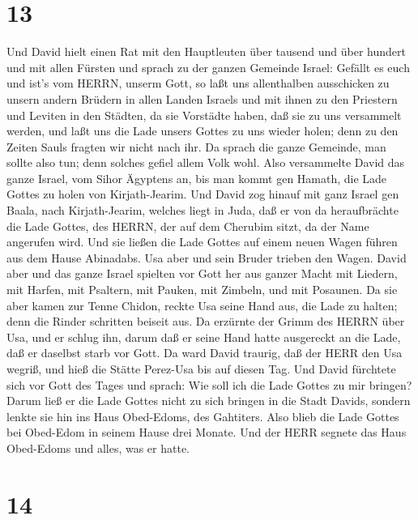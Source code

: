 \hypertarget{section-12}{%
\section{13}\label{section-12}}

 Und David hielt einen Rat mit den Hauptleuten über tausend
und über hundert und mit allen Fürsten  und sprach zu der
ganzen Gemeinde Israel: Gefällt es euch und ist's vom HERRN, unserm
Gott, so laßt uns allenthalben ausschicken zu unsern andern Brüdern in
allen Landen Israels und mit ihnen zu den Priestern und Leviten in den
Städten, da sie Vorstädte haben, daß sie zu uns versammelt werden,
 und laßt uns die Lade unsers Gottes zu uns wieder holen;
denn zu den Zeiten Sauls fragten wir nicht nach ihr.  Da
sprach die ganze Gemeinde, man sollte also tun; denn solches gefiel
allem Volk wohl.  Also versammelte David das ganze Israel,
vom Sihor Ägyptens an, bis man kommt gen Hamath, die Lade Gottes zu
holen von Kirjath-Jearim.  Und David zog hinauf mit ganz
Israel gen Baala, nach Kirjath-Jearim, welches liegt in Juda, daß er von
da heraufbrächte die Lade Gottes, des HERRN, der auf dem Cherubim sitzt,
da der Name angerufen wird.  Und sie ließen die Lade Gottes
auf einem neuen Wagen führen aus dem Hause Abinadabs. Usa aber und sein
Bruder trieben den Wagen.  David aber und das ganze Israel
spielten vor Gott her aus ganzer Macht mit Liedern, mit Harfen, mit
Psaltern, mit Pauken, mit Zimbeln, und mit Posaunen.  Da sie
aber kamen zur Tenne Chidon, reckte Usa seine Hand aus, die Lade zu
halten; denn die Rinder schritten beiseit aus.  Da erzürnte
der Grimm des HERRN über Usa, und er schlug ihn, darum daß er seine Hand
hatte ausgereckt an die Lade, daß er daselbst starb vor Gott.
 Da ward David traurig, daß der HERR den Usa wegriß, und
hieß die Stätte Perez-Usa bis auf diesen Tag.  Und David
fürchtete sich vor Gott des Tages und sprach: Wie soll ich die Lade
Gottes zu mir bringen?  Darum ließ er die Lade Gottes nicht
zu sich bringen in die Stadt Davids, sondern lenkte sie hin ins Haus
Obed-Edoms, des Gahtiters.  Also blieb die Lade Gottes bei
Obed-Edom in seinem Hause drei Monate. Und der HERR segnete das Haus
Obed-Edoms und alles, was er hatte.

\hypertarget{section-13}{%
\section{14}\label{section-13}}

